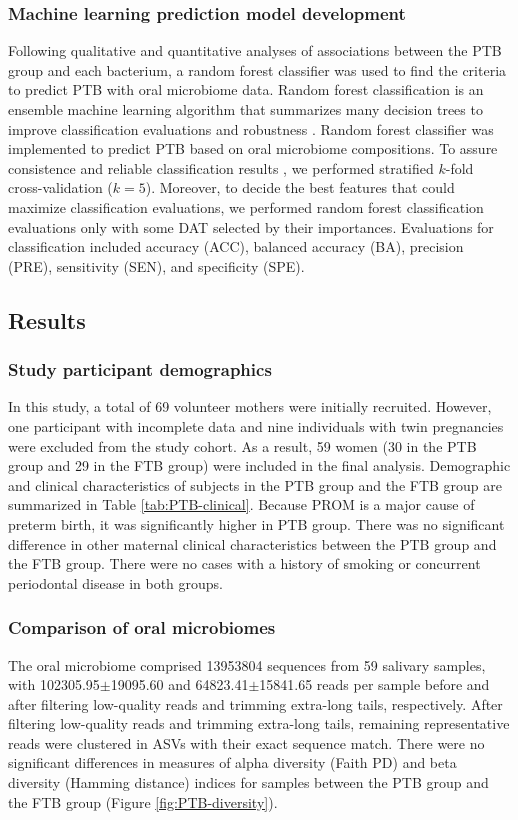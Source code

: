 \documentclass[11pt, a4paper, onecolumn, oneside]{report}
\begin{document}
            \subsubsection{Machine learning prediction model development}
                Following qualitative and quantitative analyses of associations between the PTB group and each bacterium, a random forest classifier was used to find the criteria to predict PTB with oral microbiome data. Random forest classification is an ensemble machine learning algorithm that summarizes many decision trees to improve classification evaluations and robustness \cite{RF-1}. Random forest classifier was implemented to predict PTB based on oral microbiome compositions. To assure consistence and reliable classification results \cite{Kfold-1}, we performed stratified $k$-fold cross-validation ($k=5$). Moreover, to decide the best features that could maximize classification evaluations, we performed random forest classification evaluations only with some DAT selected by their importances. Evaluations for classification included accuracy (ACC), balanced accuracy (BA), precision (PRE), sensitivity (SEN), and specificity (SPE).
        \newpage

        \subsection{Results}
            \subsubsection{Study participant demographics}
                In this study, a total of 69 volunteer mothers were initially recruited. However, one participant with incomplete data and nine individuals with twin pregnancies were excluded from the study cohort. As a result, 59 women (30 in the PTB group and 29 in the FTB group) were included in the final analysis. Demographic and clinical characteristics of subjects in the PTB group and the FTB group are summarized in Table \ref{tab:PTB-clinical}. Because PROM is a major cause of preterm birth, it was significantly higher in PTB group. There was no significant difference in other maternal clinical characteristics between the PTB group and the FTB group. There were no cases with a history of smoking or concurrent periodontal disease in both groups.

            \subsubsection{Comparison of oral microbiomes}
                The oral microbiome comprised 13953804 sequences from 59 salivary samples, with 102305.95$\pm$19095.60 and 64823.41$\pm$15841.65 reads per sample before and after filtering low-quality reads and trimming extra-long tails, respectively. After filtering low-quality reads and trimming extra-long tails, remaining representative reads were clustered in ASVs with their exact sequence match. There were no significant differences in measures of alpha diversity (Faith PD) and beta diversity (Hamming distance) indices for samples between the PTB group and the FTB group (Figure \ref{fig:PTB-diversity}).
\end{document}
